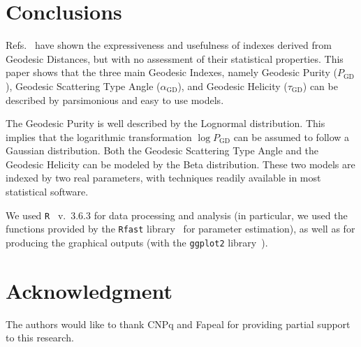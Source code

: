 \documentclass[journal]{IEEEtran}
\begin{document}
\section{Conclusions}

Refs.~\cite{ClassificationPolSARGeodesic,AGeneralizedVolumeScatteringModelBasedVegetationIndexfromPolarimetricSARData2019,NovelTechniquesforBuiltupAreaExtractionfromPolarimetricSARImages2019,APolSARScatteringPowerFactorizationFrameworkandNovelRollInvariantParametersBasedUnsupervisedClassificationSchemeUsingaGeodesicDistanceinpress,ChangeDetectionPolSARGeodesicDistanceBetweenScatteringMechanisms,ARadarVegetationIndexforCropMonitoringUsingCompactPolarimetricSARData}
have shown the expressiveness and usefulness of indexes derived from Geodesic Distances, but with no assessment of their statistical properties.
This paper shows that the three main Geodesic Indexes, namely
Geodesic Purity ($P_{\text{GD}}$),
Geodesic Scattering Type Angle ($\alpha_{\text{GD}}$), and
Geodesic Helicity ($\tau_{\text{GD}}$) can be described by parsimonious and easy to use models.

The Geodesic Purity is well described by the Lognormal distribution.
This implies that the logarithmic transformation $\log P_{\text{GD}}$ can be assumed to follow a Gaussian distribution.
Both the Geodesic Scattering Type Angle and the Geodesic Helicity can be modeled by the Beta distribution.
These two models are indexed by two real parameters, with techniques readily available in most statistical software.

We used \texttt{R}~\cite{RManual} v.~3.6.3 for data processing and analysis (in particular, we used the functions provided by the \texttt{Rfast} library~\cite{Rfast} for parameter estimation), as well as for producing the graphical outputs (with the \texttt{ggplot2} library~\cite{ggplot2}).

\section*{Acknowledgment}

The authors would like to thank CNPq and Fapeal for providing partial support to this research.



\end{document}
